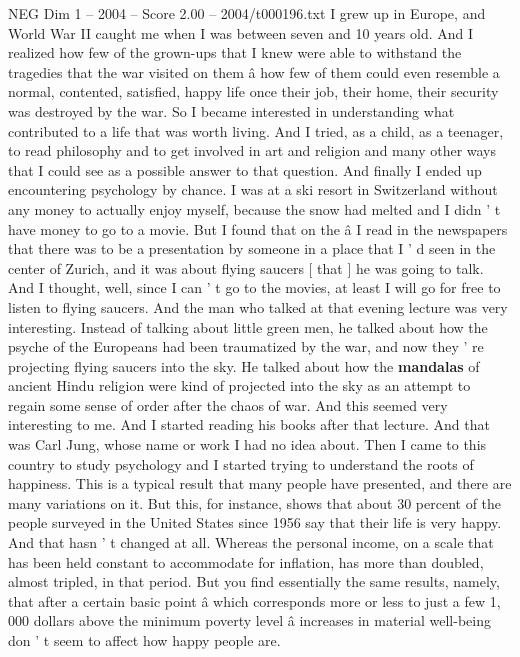 \begin{textsample}{NEG Dim 1 – 2004 – Score 2.00 – 2004/t000196.txt}  \label{ex:f1_neg_056}
I grew up in Europe, and World War II caught me when I was between seven and 10 years old.
And I realized how few of the grown-ups that I knew were able to withstand the tragedies that the war visited on them â how few of them could even resemble a normal, contented, satisfied, happy life once their job, their home, their security was destroyed by the war.
So I became interested in understanding what contributed to a life that was worth living.
And I tried, as a child, as a teenager, to read philosophy and to get involved in art and religion and many other ways that I could see as a possible answer to that question.
And finally I ended up encountering psychology by chance.
I was at a ski resort in Switzerland without any money to actually enjoy myself, because the snow had melted and I didn ' t have money to go to a movie.
But I found that on the â I read in the newspapers that there was to be a presentation by someone in a place that I ' d seen in the center of Zurich, and it was about flying saucers [ that ] he was going to talk.
And I thought, well, since I can ' t go to the movies, at least I will go for free to listen to flying saucers.
And the man who talked at that evening lecture was very interesting.
Instead of talking about little green men, he talked about how the psyche of the Europeans had been traumatized by the war, and now they ' re projecting flying saucers into the sky.
He talked about how the \textbf{mandalas} of ancient Hindu religion were kind of projected into the sky as an attempt to regain some sense of order after the chaos of war.
And this seemed very interesting to me.
And I started reading his books after that lecture.
And that was Carl Jung, whose name or work I had no idea about.
Then I came to this country to study psychology and I started trying to understand the roots of happiness.
This is a typical result that many people have presented, and there are many variations on it.
But this, for instance, shows that about 30 percent of the people surveyed in the United States since 1956 say that their life is very happy.
And that hasn ' t changed at all.
Whereas the personal income, on a scale that has been held constant to accommodate for inflation, has more than doubled, almost tripled, in that period.
But you find essentially the same results, namely, that after a certain basic point â which corresponds more or less to just a few 1, 000 dollars above the minimum poverty level â increases in material well-being don ' t seem to affect how happy people are.

\end{textsample}

